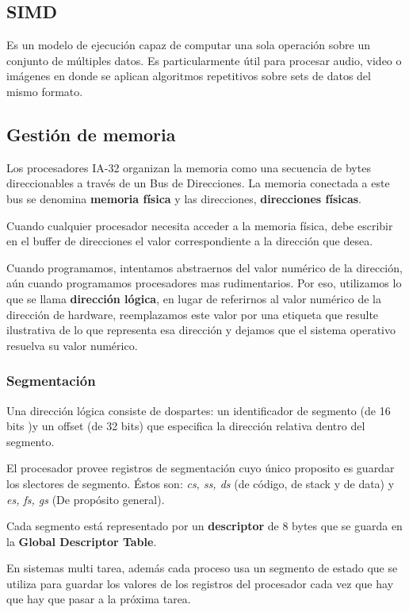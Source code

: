 \subsection{SIMD}
Es un modelo de ejecución capaz de computar una sola operación sobre un conjunto de múltiples datos. Es particularmente útil para procesar audio, video o imágenes en donde se aplican algoritmos repetitivos sobre sets de datos del mismo formato.

\subsection{Gestión de memoria} 
Los procesadores IA-32 organizan la memoria como una secuencia de bytes direccionables a través de un Bus de Direcciones. La memoria conectada a este bus se denomina \textbf{memoria física} y las direcciones, \textbf{direcciones físicas}.

Cuando cualquier procesador necesita acceder a la memoria física, debe escribir en el buffer de direcciones el valor correspondiente a la dirección que desea.

Cuando programamos, intentamos abstraernos del valor numérico de la dirección, aún cuando programamos procesadores mas rudimentarios. Por eso, utilizamos lo que se llama \textbf{dirección lógica}, en lugar de referirnos al valor numérico de la dirección de hardware, reemplazamos este valor por una etiqueta que resulte ilustrativa de lo que representa esa dirección y dejamos que el sistema operativo resuelva su valor numérico.

\subsubsection{Segmentación}
Una dirección lógica consiste de dospartes: un identificador de segmento (de 16 bits )y un offset (de 32 bits) que especifica la dirección relativa dentro del segmento. 

El procesador provee registros de segmentación cuyo único proposito es guardar los slectores de segmento. Éstos son: \textit{cs, ss, ds} (de código, de stack y de data) y \textit{es, fs, gs} (De propósito general).

Cada segmento está representado por un \textbf{descriptor} de 8 bytes que se guarda en la \textbf{Global Descriptor Table}. 

En sistemas multi tarea, además cada proceso usa un segmento de estado que se utiliza para guardar los valores de los registros del procesador cada vez que hay que hay que pasar a la próxima tarea.

